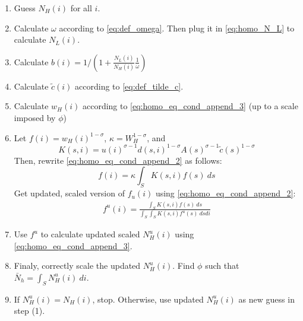 \documentclass{article}
\begin{document}
\begin{enumerate}
\item Guess $N_H(i)$ for all $i$.
\item Calculate $\omega$ according to \eqref{eq:def_omega}. Then plug it in \eqref{eq:homo_N_L} to calculate $N_L(i)$.
\item Calculate $b(i)
= 1/(1 + \frac{N_L(i)}{N_H(i)} \frac{1}{\omega}) $
\item Calculate $\tilde{c}(i)$ according to \eqref{eq:def_tilde_c}.
\item Calculate $w_H(i)$ according to \eqref{eq:homo_eq_cond_append_3} (up to a scale imposed by $\phi$)
\item Let $f(i)=w_H(i)^{1-\sigma}$, $\kappa=W_H^{1-\sigma}$, and
\[
K(s,i) = u(i)^{\sigma-1} d(s,i)^{1-\sigma} A(s)^{\sigma-1} \tilde{c}(s)^{1-\sigma}
\]
Then, rewrite \eqref{eq:homo_eq_cond_append_2} as follows:
\[
f(i) = \kappa \int_S K(s,i) f(s)~ds
\]
Get updated, scaled version of $f_u(i)$ using \eqref{eq:homo_eq_cond_append_2}: 
\begin{eqnarray}
    f^u(i) = \frac{\int_S K(s,i) f(s)~ds}{\int_S \int_S K(s,i) f^u(s)~ds di}\nonumber
\end{eqnarray}
\item Use $f^u$ to calculate updated scaled $N^u_H(i)$ using \eqref{eq:homo_eq_cond_append_3}. 
\item Finaly, correctly scale the updated $N^u_H(i)$.  Find $\phi$ such that $\bar{N}_h=\int_S N^u_H(i)~di$.
\item If $N^u_H(i) = N_H(i)$, stop.  Otherwise, use updated $N^u_H(i)$ as new guess in step (1). 
\end{enumerate}

\newpage



\end{document}
